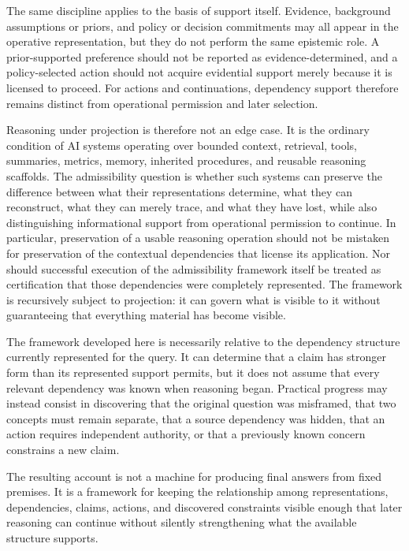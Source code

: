 \documentclass[11pt]{article}
\begin{document}
The same discipline applies to the basis of support itself. Evidence, background assumptions or priors, and policy or decision commitments may all appear in the operative representation, but they do not perform the same epistemic role. A prior-supported preference should not be reported as evidence-determined, and a policy-selected action should not acquire evidential support merely because it is licensed to proceed. For actions and continuations, dependency support therefore remains distinct from operational permission and later selection.

Reasoning under projection is therefore not an edge case. It is the ordinary condition of AI systems operating over bounded context, retrieval, tools, summaries, metrics, memory, inherited procedures, and reusable reasoning scaffolds. The admissibility question is whether such systems can preserve the difference between what their representations determine, what they can reconstruct, what they can merely trace, and what they have lost, while also distinguishing informational support from operational permission to continue. In particular, preservation of a usable reasoning operation should not be mistaken for preservation of the contextual dependencies that license its application. Nor should successful execution of the admissibility framework itself be treated as certification that those dependencies were completely represented. The framework is recursively subject to projection: it can govern what is visible to it without guaranteeing that everything material has become visible.

The framework developed here is necessarily relative to the dependency structure currently represented for the query. It can determine that a claim has stronger form than its represented support permits, but it does not assume that every relevant dependency was known when reasoning began. Practical progress may instead consist in discovering that the original question was misframed, that two concepts must remain separate, that a source dependency was hidden, that an action requires independent authority, or that a previously known concern constrains a new claim.

The resulting account is not a machine for producing final answers from fixed premises. It is a framework for keeping the relationship among representations, dependencies, claims, actions, and discovered constraints visible enough that later reasoning can continue without silently strengthening what the available structure supports.
\end{document}
